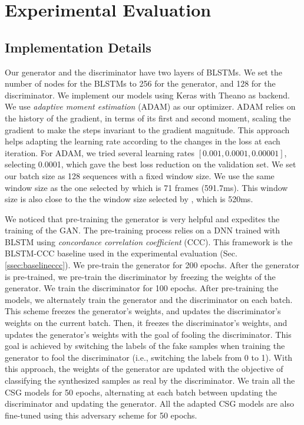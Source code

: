 \documentclass[10pt,journal,compsoc]{IEEEtran}
\begin{document}
\section{Experimental Evaluation}
\label{sec:ExperimentalEvaluation}

\subsection{Implementation Details}
\label{ssec:Implementation}    
Our generator and the discriminator have two layers of BLSTMs. We set the number of nodes for the BLSTMs to 256 for the generator, and 128 for the discriminator. We implement our models using Keras with Theano as backend. We use \emph{adaptive moment estimation} (ADAM) \cite{Kingma_2014_2} as our optimizer. ADAM relies on the history of the gradient, in terms of its first and second moment, scaling the gradient to make the steps invariant to the gradient magnitude. This approach helps adapting the learning rate according to the changes in the loss at each iteration. For ADAM, we tried several learning rates $\left[0.001, 0.0001, 0.00001\right]$, selecting 0.0001, which gave the best loss reduction on the validation set. We set our batch size as 128 sequences with a fixed window size. We use the same window size as the one selected by \citet{Sadoughi_2018_2,Sadoughi_2018} which is 71 frames (591.7ms). This window size is also close to the the window size selected by \citet{Karras_2017}, which is 520ms.

We noticed that pre-training the generator is very helpful and expedites the training of the GAN.  The pre-training process relies on a DNN trained with BLSTM using \emph{concordance correlation coefficient} (CCC). This framework is the BLSTM-CCC baseline used in the experimental evaluation (Sec. \ref{ssec:baselineccc}). We pre-train the generator for 200 epochs. After the generator is pre-trained, we pre-train the discriminator by freezing the weights of the generator. We train the discriminator for 100 epochs.  After pre-training the models, we alternately train the generator and the discriminator on each batch. This scheme freezes the generator's weights, and updates the discriminator's weights on the current batch. Then, it freezes the discriminator's weights, and updates the generator's weights with the goal of fooling the discriminator. This goal is achieved by switching the labels of the fake samples when training the generator to fool the discriminator (i.e., switching the labels from 0 to 1). With this approach, the weights of the generator are updated with the objective of classifying the synthesized samples as real by the discriminator. We train all the CSG models for 50 epochs, alternating at each batch between updating the discriminator and updating the generator. All the adapted CSG models are also fine-tuned using this adversary scheme for 50 epochs.
\end{document}

